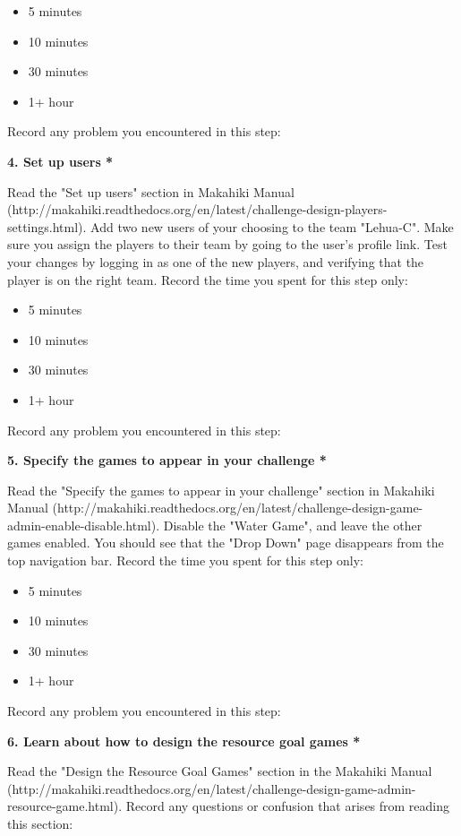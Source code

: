 \begin{itemize}
\item 5 minutes
\item  10 minutes
\item  30 minutes
\item  1+ hour
\end{itemize}


Record any problem you encountered in this step:

{\bf 4. Set up users *}

Read the "Set up users" section in Makahiki Manual (http://makahiki.readthedocs.org/en/latest/challenge-design-players-settings.html). Add two new users of your choosing to the team "Lehua-C". Make sure you assign the players to their team by going to the user's profile link. Test your changes by logging in as one of the new players, and verifying that the player is on the right team. Record the time you spent for this step only:

\begin{itemize}
\item 5 minutes
\item  10 minutes
\item  30 minutes
\item  1+ hour
\end{itemize}


Record any problem you encountered in this step:

{\bf 5. Specify the games to appear in your challenge *}

Read the "Specify the games to appear in your challenge" section in Makahiki Manual (http://makahiki.readthedocs.org/en/latest/challenge-design-game-admin-enable-disable.html). Disable the "Water Game", and leave the other games enabled. You should see that the "Drop Down" page disappears from the top navigation bar. Record the time you spent for this step only:

\begin{itemize}
\item 5 minutes
\item  10 minutes
\item  30 minutes
\item  1+ hour
\end{itemize}


Record any problem you encountered in this step:

{\bf 6. Learn about how to design the resource goal games *}

Read the "Design the Resource Goal Games" section in the Makahiki Manual (http://makahiki.readthedocs.org/en/latest/challenge-design-game-admin-resource-game.html). Record any questions or confusion that arises from reading this section:

